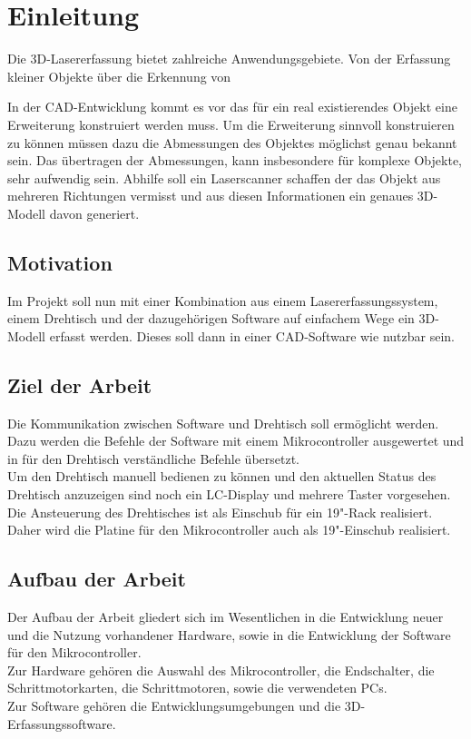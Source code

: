 \chapter{Einleitung}
\label{cha:Einleitung}

Die 3D-Lasererfassung bietet zahlreiche Anwendungsgebiete. Von der Erfassung kleiner Objekte über die Erkennung von 

In der CAD-Entwicklung kommt es vor das für ein real existierendes Objekt eine Erweiterung konstruiert werden muss. Um die Erweiterung sinnvoll konstruieren zu können müssen dazu die Abmessungen des Objektes möglichst genau bekannt sein. Das übertragen der Abmessungen, kann insbesondere für komplexe Objekte, sehr aufwendig sein.
Abhilfe soll ein Laserscanner schaffen der das Objekt aus mehreren Richtungen vermisst und aus diesen Informationen ein genaues 3D-Modell davon generiert. 

\section{Motivation}
\label{sec:Motivation}
Im Projekt soll nun mit einer Kombination aus einem Lasererfassungssystem, einem Drehtisch und der dazugehörigen Software auf einfachem Wege ein 3D-Modell erfasst werden. Dieses soll dann in einer CAD-Software wie  nutzbar sein. 

\section{Ziel der Arbeit}
\label{sec:ZielDerArbeit}
Die Kommunikation zwischen Software und Drehtisch soll ermöglicht werden. Dazu werden die Befehle der Software mit einem Mikrocontroller ausgewertet und in für den Drehtisch verständliche Befehle übersetzt.\\
Um den Drehtisch manuell bedienen zu können und den aktuellen Status des Drehtisch anzuzeigen sind noch ein LC-Display und mehrere Taster vorgesehen.\\
Die Ansteuerung des Drehtisches ist als Einschub für ein 19"-Rack realisiert. Daher wird die Platine für den Mikrocontroller auch als 19"-Einschub realisiert.

\section{Aufbau der Arbeit}
\label{sec:AufbauDerArbeit}
Der Aufbau der Arbeit gliedert sich im Wesentlichen in die Entwicklung neuer und die Nutzung vorhandener Hardware, sowie in die Entwicklung der Software für den Mikrocontroller. \\
Zur Hardware gehören die Auswahl des Mikrocontroller, die Endschalter, die Schrittmotorkarten, die Schrittmotoren, sowie die verwendeten PCs.\\
Zur Software gehören die Entwicklungsumgebungen und die 3D-Erfassungssoftware.

